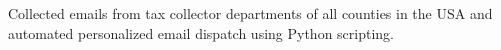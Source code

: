   {Collected emails from tax collector departments of all counties in the USA and automated personalized email dispatch using Python scripting.}
